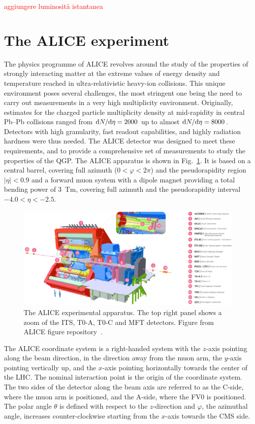 \textcolor{red}{aggiungere luminosità istantanea}

\section{The ALICE experiment}
The physics programme of ALICE revolves around the study of the properties of strongly interacting matter at the extreme values of energy density and temperature reached in ultra-relativistic heavy-ion collisions. This unique environment poses several challenges, the most stringent one being the need to carry out measurements in a very high multiplicity environment. Originally, estimates for the charged particle multiplicity density at mid-rapidity in central Pb--Pb collisions ranged from $\mathrm{d} N/\mathrm{d}\eta = 2000$ up to almost $\mathrm{d} N/\mathrm{d}\eta = 8000$. Detectors with high granularity, fast readout capabilities, and highly radiation hardness were thus needed. The ALICE detector was designed to meet these requirements, and to provide a comprehensive set of measurements to study the properties of the QGP. The ALICE apparatus is shown in Fig.~\ref{fig:ALICE}. It is based on a central barrel, covering full azimuth ($0 < \varphi < 2\pi$) and the pseudorapidity region $\lvert \eta\rvert <0.9$ and a forward muon system with a dipole magnet providing a total bending power of 3~Tm, covering full azimuth and the pseudorapidity interval $-4.0 < \eta < -2.5$.

\begin{figure}
    \centering
    \includegraphics[width=\textwidth]{Figures/Chapter 3/ALICE_Scheme.png}
    \caption{The ALICE experimental apparatus. The top right panel shows a zoom of the ITS, T0-A, T0-C and MFT detectors. Figure from ALICE figure repository~\cite{ALICE_figures}.}
    \label{fig:ALICE}
\end{figure}

The ALICE coordinate system is a right-handed system with the $z$-axis pointing along the beam direction, in the direction away from the muon arm, the $y$-axis pointing vertically up, and the $x$-axis pointing horizontally towards the center of the LHC. The nominal interaction point is the origin of the coordinate system. The two sides of the detector along the beam axis are referred to as the C-side, where the muon arm is positioned, and the A-side, where the FV0 is positioned. The polar angle $\theta$ is defined with respect to the $z$-direction and $\varphi$, the azimuthal angle, increases counter-clockwise
starting from the $x$-axis towards the CMS side.


